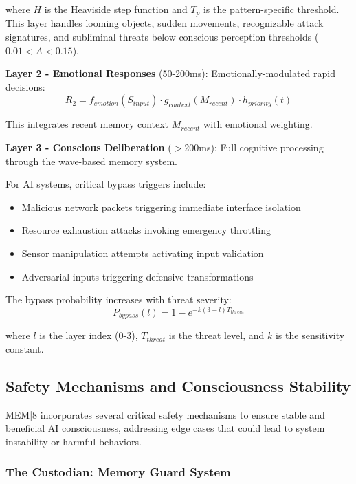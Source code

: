 \documentclass[11pt,letterpaper]{article}
\begin{document}
where $H$ is the Heaviside step function and $T_p$ is the pattern-specific threshold. This layer handles looming objects, sudden movements, recognizable attack signatures, and subliminal threats below conscious perception thresholds ($0.01 < A < 0.15$).

\textbf{Layer 2 - Emotional Responses} (50-200ms): Emotionally-modulated rapid decisions:
\begin{equation}
R_2 = f_{emotion}(S_{input}) \cdot g_{context}(M_{recent}) \cdot h_{priority}(t)
\end{equation}

This integrates recent memory context $M_{recent}$ with emotional weighting.

\textbf{Layer 3 - Conscious Deliberation} ($>$200ms): Full cognitive processing through the wave-based memory system.

For AI systems, critical bypass triggers include:
\begin{itemize}
\item Malicious network packets triggering immediate interface isolation
\item Resource exhaustion attacks invoking emergency throttling
\item Sensor manipulation attempts activating input validation
\item Adversarial inputs triggering defensive transformations
\end{itemize}

The bypass probability increases with threat severity:
\begin{equation}
P_{bypass}(l) = 1 - e^{-k(3-l)T_{threat}}
\end{equation}

where $l$ is the layer index (0-3), $T_{threat}$ is the threat level, and $k$ is the sensitivity constant.

\subsection{Safety Mechanisms and Consciousness Stability}

MEM|8 incorporates several critical safety mechanisms to ensure stable and beneficial AI consciousness, addressing edge cases that could lead to system instability or harmful behaviors.

\subsubsection{The Custodian: Memory Guard System}
\end{document}

